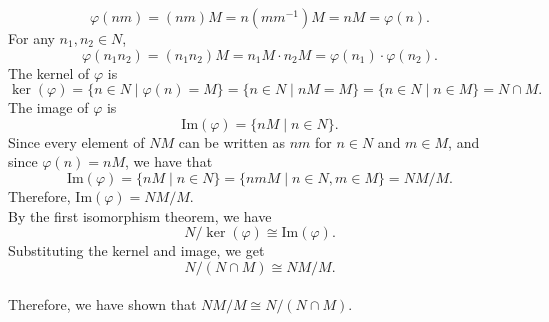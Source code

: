    \[
    \varphi(nm) = (nm)M = n(mm^{-1})M = nM = \varphi(n).
    \]
For any \(n_1, n_2 \in N\),
    \[
    \varphi(n_1 n_2) = (n_1 n_2)M = n_1 M \cdot n_2 M = \varphi(n_1) \cdot \varphi(n_2).
    \]
The kernel of \(\varphi\) is
    \[
    \ker(\varphi) = \{n \in N \mid \varphi(n) = M\} = \{n \in N \mid nM = M\} = \{n \in N \mid n \in M\} = N \cap M.
    \]
The image of \(\varphi\) is
    \[
    \text{Im}(\varphi) = \{nM \mid n \in N\}.
    \]
    Since every element of \(NM\) can be written as \(nm\) for \(n \in N\) and \(m \in M\), and since \(\varphi(n) = nM\), we have that
    \[
    \text{Im}(\varphi) = \{nM \mid n \in N\} = \{nmM \mid n \in N, m \in M\} = NM/M.
    \]
    Therefore, \(\text{Im}(\varphi) = NM / M\).
\\
By the first isomorphism theorem, we have
    \[
    N / \ker(\varphi) \cong \text{Im}(\varphi).
    \]
    Substituting the kernel and image, we get
    \[
    N / (N \cap M) \cong NM / M.
    \]
\\
Therefore, we have shown that \( NM / M \cong N / (N \cap M) \).
